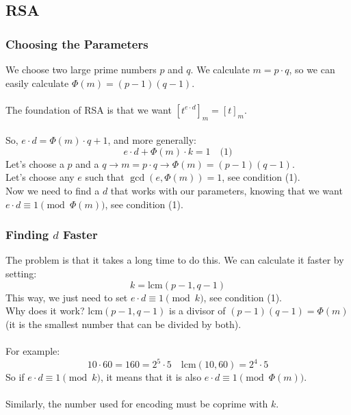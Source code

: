 \documentclass{article}
\begin{document}
\subsection{RSA}

\subsubsection{Choosing the Parameters}

We choose two large prime numbers \( p \) and \( q \).
We calculate \( m = p \cdot q \), so we can easily calculate \(\Phi(m) = (p-1)(q-1)\).\\\\
The foundation of RSA is that we want \([t^{e \cdot d}]_m = [t]_m\).\\\\
So, \( e \cdot d = \Phi(m) \cdot q + 1 \), and more generally:
\[
e \cdot d + \Phi(m) \cdot k = 1 \quad \text{(1)}
\]
Let's choose a \( p \) and a \( q \rightarrow m = p \cdot q \rightarrow \Phi(m) = (p-1)(q-1)\).\\
Let's choose any \( e \) such that \( \gcd(e, \Phi(m)) = 1 \), see condition (1).\\
Now we need to find a \( d \) that works with our parameters, knowing that we want \( e \cdot d \equiv 1 \pmod{\Phi(m)} \), see condition (1).

\subsubsection{Finding \( d \) Faster}

The problem is that it takes a long time to do this. We can calculate it faster by setting:
\[
k = \mathrm{lcm}(p - 1, q - 1)
\]
This way, we just need to set \( e \cdot d \equiv 1 \pmod{k} \), see condition (1).\\
Why does it work? \(\mathrm{lcm}(p - 1, q-1)\) is a divisor of \((p-1)(q-1) = \Phi(m)\) (it is the smallest number that can be divided by both).\\\\
For example:
\[
10 \cdot 60 = 160 = 2^5 \cdot 5 \quad \mathrm{lcm}(10, 60) = 2^4 \cdot 5
\]
So if \( e \cdot d \equiv 1 \pmod{k} \), it means that it is also \( e \cdot d \equiv 1 \pmod{\Phi(m)} \).\\\\
Similarly, the number used for encoding must be coprime with \( k \).\\\\
\end{document}

